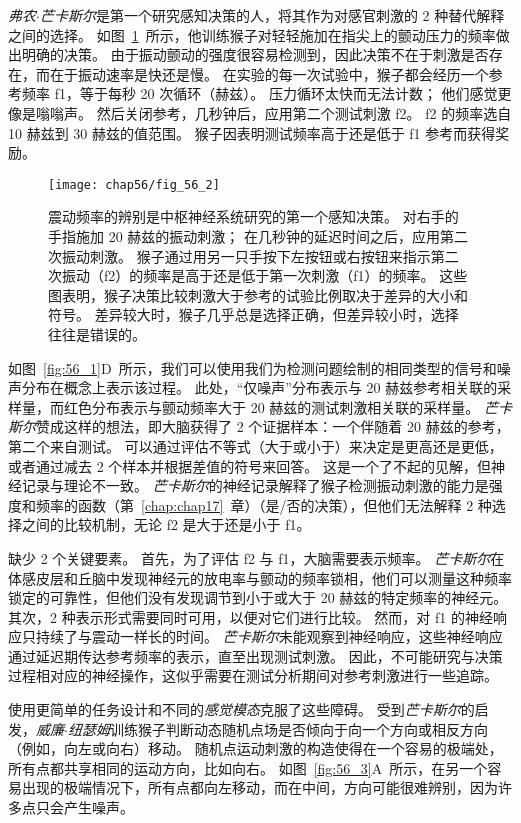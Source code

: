\textit{弗农$\cdot$芒卡斯尔}是第一个研究感知决策的人，将其作为对感官刺激的 2 种替代解释之间的选择。
如图~\ref{fig:56_2}~所示，他训练猴子对轻轻施加在指尖上的颤动压力的频率做出明确的决策。
由于振动颤动的强度很容易检测到，因此决策不在于刺激是否存在，而在于振动速率是快还是慢。
在实验的每一次试验中，猴子都会经历一个参考频率 f1，等于每秒 20 次循环（赫兹）。
压力循环太快而无法计数；
他们感觉更像是嗡嗡声。
然后关闭参考，几秒钟后，应用第二个测试刺激 f2。
f2 的频率选自 10 赫兹到 30 赫兹的值范围。
猴子因表明测试频率高于还是低于 f1 参考而获得奖励。


\begin{figure}[htbp]
	\centering
	\texttt{[image: chap56/fig\_56\_2]}
	\caption{震动频率的辨别是中枢神经系统研究的第一个感知决策。
		对右手的手指施加 20 赫兹的振动刺激；
		在几秒钟的延迟时间之后，应用第二次振动刺激。
		猴子通过用另一只手按下左按钮或右按钮来指示第二次振动（f2）的频率是高于还是低于第一次刺激（f1）的频率。
		这些图表明，猴子决策比较刺激大于参考的试验比例取决于差异的大小和符号。
		差异较大时，猴子几乎总是选择正确，但差异较小时，选择往往是错误的\cite{romo2001touch}。}
	\label{fig:56_2}
\end{figure}


如图~\ref{fig:56_1}D~所示，我们可以使用我们为检测问题绘制的相同类型的信号和噪声分布在概念上表示该过程。
此处，“仅噪声”分布表示与 20 赫兹参考相关联的采样量，而红色分布表示与颤动频率大于 20 赫兹的测试刺激相关联的采样量。
\textit{芒卡斯尔}赞成这样的想法，即大脑获得了 2 个证据样本：一个伴随着 20 赫兹的参考，第二个来自测试。
可以通过评估不等式（大于或小于）来决定是更高还是更低，或者通过减去 2 个样本并根据差值的符号来回答。
这是一个了不起的见解，但神经记录与理论不一致。
\textit{芒卡斯尔}的神经记录解释了猴子检测振动刺激的能力是强度和频率的函数（第~\ref{chap:chap17}~章）（是/否的决策），但他们无法解释 2 种选择之间的比较机制，无论 f2 是大于还是小于 f1。


缺少 2 个关键要素。
首先，为了评估 f2 与 f1，大脑需要表示频率。
\textit{芒卡斯尔}在体感皮层和丘脑中发现神经元的放电率与颤动的频率锁相，他们可以测量这种频率锁定的可靠性，但他们没有发现调节到小于或大于 20 赫兹的特定频率的神经元。
其次，2 种表示形式需要同时可用，以便对它们进行比较。
然而，对 f1 的神经响应只持续了与震动一样长的时间。
\textit{芒卡斯尔}未能观察到神经响应，这些神经响应通过延迟期传达参考频率的表示，直至出现测试刺激。
因此，不可能研究与决策过程相对应的神经操作，这似乎需要在测试分析期间对参考刺激进行一些追踪。


使用更简单的任务设计和不同的\textit{感觉模态}克服了这些障碍。
受到\textit{芒卡斯尔}的启发，\textit{威廉$\cdot$纽瑟姆}训练猴子判断动态随机点场是否倾向于向一个方向或相反方向（例如，向左或向右）移动。
随机点运动刺激的构造使得在一个容易的极端处，所有点都共享相同的运动方向，比如向右。
如图~\ref{fig:56_3}A~所示，在另一个容易出现的极端情况下，所有点都向左移动，而在中间，方向可能很难辨别，因为许多点只会产生噪声。


